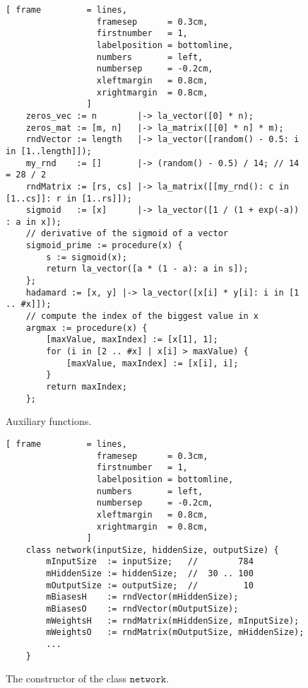 \begin{figure}[!ht]
\centering
\begin{Verbatim}[ frame         = lines, 
                  framesep      = 0.3cm, 
                  firstnumber   = 1,
                  labelposition = bottomline,
                  numbers       = left,
                  numbersep     = -0.2cm,
                  xleftmargin   = 0.8cm,
                  xrightmargin  = 0.8cm,
                ]
    zeros_vec := n        |-> la_vector([0] * n);
    zeros_mat := [m, n]   |-> la_matrix([[0] * n] * m);
    rndVector := length   |-> la_vector([random() - 0.5: i in [1..length]]);
    my_rnd    := []       |-> (random() - 0.5) / 14; // 14 = 28 / 2
    rndMatrix := [rs, cs] |-> la_matrix([[my_rnd(): c in [1..cs]]: r in [1..rs]]);
    sigmoid   := [x]      |-> la_vector([1 / (1 + exp(-a)) : a in x]);
    // derivative of the sigmoid of a vector
    sigmoid_prime := procedure(x) {
        s := sigmoid(x); 
        return la_vector([a * (1 - a): a in s]);
    };
    hadamard := [x, y] |-> la_vector([x[i] * y[i]: i in [1 .. #x]]);
    // compute the index of the biggest value in x
    argmax := procedure(x) {
        [maxValue, maxIndex] := [x[1], 1];
        for (i in [2 .. #x] | x[i] > maxValue) {
            [maxValue, maxIndex] := [x[i], i];
        }
        return maxIndex;
    };
\end{Verbatim}
\vspace*{-0.3cm}
\caption{Auxiliary functions.}
\label{fig:nn.stlx:auxiliary}
\end{figure}

\begin{figure}[!ht]
\centering
\begin{Verbatim}[ frame         = lines, 
                  framesep      = 0.3cm, 
                  firstnumber   = 1,
                  labelposition = bottomline,
                  numbers       = left,
                  numbersep     = -0.2cm,
                  xleftmargin   = 0.8cm,
                  xrightmargin  = 0.8cm,
                ]
    class network(inputSize, hiddenSize, outputSize) {
        mInputSize  := inputSize;   //        784
        mHiddenSize := hiddenSize;  //  30 .. 100
        mOutputSize := outputSize;  //         10
        mBiasesH    := rndVector(mHiddenSize);
        mBiasesO    := rndVector(mOutputSize);
        mWeightsH   := rndMatrix(mHiddenSize, mInputSize);
        mWeightsO   := rndMatrix(mOutputSize, mHiddenSize);
        ...   
    }
\end{Verbatim}
\vspace*{-0.3cm}
\caption{The constructor of the class $\mathtt{network}$.}
\label{fig:nn.stlx:network}
\end{figure}

